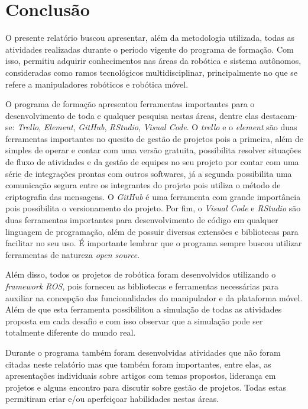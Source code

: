\chapter{Conclusão}
\label{chap:conc}

O presente relatório buscou apresentar, além da metodologia utilizada, todas as atividades realizadas durante o período vigente do programa de formação. Com isso, permitiu adquirir conhecimentos nas áreas da robótica e sistema autônomos, consideradas como ramos tecnológicos multidisciplinar, principalmente no que se refere a manipuladores robóticos e robótica móvel.  

O programa de formação apresentou ferramentas importantes para o desenvolvimento de toda e qualquer pesquisa nestas áreas, dentre elas destacam-se: \textit{Trello}, \textit{Element}, \textit{GitHub}, \textit{RStudio}, \textit{Visual Code}. O \textit{trello} e o \textit{element} são duas ferramentas importantes no quesito de gestão de projetos pois a primeira, além de simples de operar e contar com uma versão gratuita, possibilita resolver situações de fluxo de atividades e da gestão de equipes no seu projeto por contar com uma série de integrações prontas com outros softwares, já a segunda possibilita uma comunicação segura entre os integrantes do projeto pois utiliza o método de criptografia das mensagens. O \textit{GitHub} é uma ferramenta com grande importância pois possibilita o versionamento do projeto. Por fim, o \textit{Visual Code} e \textit{RStudio} são duas ferramentas importantes para desenvolvimento de código em qualquer linguagem de programação, além de possuir diversas extensões e bibliotecas para facilitar no seu uso. É importante lembrar que o programa sempre buscou utilizar ferramentas de natureza \textit{open source}.

Além disso, todos os projetos de robótica foram desenvolvidos utilizando o \textit{framework} \textit{ROS}, pois forneceu as bibliotecas e ferramentas necessárias para auxiliar na concepção das funcionalidades do manipulador e da plataforma móvel. Além de que esta ferramenta possibilitou a simulação de todas as atividades proposta em cada desafio e com isso observar que a simulação pode ser totalmente diferente do mundo real.  

Durante o programa também foram desenvolvidas atividades que não foram citadas neste relatório mas que também foram importantes, entre elas, as apresentações individuais sobre artigos com temas propostos, liderança em projetos e alguns encontro para discutir sobre gestão de projetos. Todas estas permitiram criar e/ou aperfeiçoar habilidades nestas áreas.

